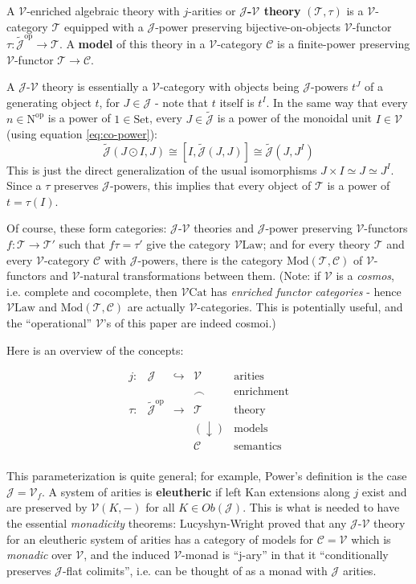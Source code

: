 \documentclass[a4paper,UKenglish]{article}
\theoremstyle{definition}
\newcommand{\Set}{\mathrm{Set}}
\newcommand{\Cat}{\mathrm{Cat}}
\newcommand{\Law}{\mathrm{Law}}
\newcommand{\Mod}{\mathrm{Mod}}
\newcommand{\op}{\mathrm{op}}
\newcommand{\NN}{\mathrm{N}}
\newcommand{\V}{\mathscr{V}}
\newcommand{\C}{\mathscr{C}}
\newcommand{\J}{\mathscr{J}}
\newcommand{\T}{\mathscr{T}}
\begin{document}
A $\V$-enriched algebraic theory with $j$-arities or \textbf{$\J$-$\V$ theory} $(\T,\tau)$ is a $\V$-category $\T$ equipped with a $\J$-power preserving bijective-on-objects $\V$-functor $\tau:\tilde{\J}^\op \to \T$. A \textbf{model} of this theory in a $\V$-category $\C$ is a finite-power preserving $\V$-functor $\T \to \C$.

A $\J$-$\V$ theory is essentially a $\V$-category with objects being $\J$-powers $t^J$ of a generating object $t$, for $J \in \J$ - note that $t$ itself is $t^I$. In the same way that every $n\in \NN^\op$ is a power of $1 \in \Set$, every $J\in \tilde{\J}$ is a power of the monoidal unit $I\in \V$ (using equation \ref{eq:co-power}): $$\tilde{\J}(J\odot I,J) \cong [I, \tilde{\J}(J,J)] \cong \tilde{\J}(J,J^I)$$ This is just the direct generalization of the usual isomorphisms $J \times I \simeq J \simeq J^I$. Since a $\tau$ preserves $\J$-powers, this implies that every object of $\T$ is a power of $t = \tau(I)$.

Of course, these form categories: $\J$-$\V$ theories and $\J$-power preserving $\V$-functors $f: \T \to \T'$ such that $f\tau = \tau'$ give the category $\V\Law$; and for every theory $\T$ and every $\V$-category $\C$ with $\J$-powers, there is the category $\Mod(\T,\C)$ of $\V$-functors and $\V$-natural transformations between them. (Note: if $\V$ is a \textit{cosmos}, i.e. complete and cocomplete, then $\V\Cat$ has \textit{enriched functor categories} - hence $\V\Law$ and $\Mod(\T,\C)$ are actually $\V$-categories. This is potentially useful, and the ``operational'' $\V$'s of this paper are indeed cosmoi.)

Here is an overview of the concepts: 

\[\begin{array}{ccccl}
j: & \J & \hookrightarrow & \V & \text{arities}\\
& & & \frown & \text{enrichment}\\
\tau: & \tilde{\J}^\op & \to & \T & \text{theory}\\
& & & (\downarrow) & \text{models}\\
& & & \C & \text{semantics}\\
\end{array}\]

This parameterization is quite general; for example, Power's definition is the case $\J = \V_f$. A system of arities is \textbf{eleutheric} if left Kan extensions along $j$ exist and are preserved by $\V(K,-)$ for all $K \in Ob(\J)$. This is what is needed to have the essential \textit{monadicity} theorems: Lucyshyn-Wright proved that any $\J$-$\V$ theory for an eleutheric system of arities has a category of models for $\C = \V$ which is \textit{monadic} over $\V$, and the induced $\V$-monad is ``j-ary'' in that it ``conditionally preserves $\J$-flat colimits'', i.e. can be thought of as a monad with $\J$ arities.
\end{document}
